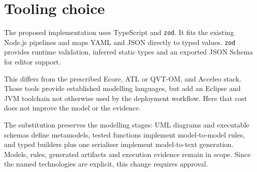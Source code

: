 \section{Tooling choice}
\label{sec:tooling}

The proposed implementation uses TypeScript and \texttt{zod}. It fits the
existing Node.js pipelines and maps YAML and JSON directly to typed values.
\texttt{zod} provides runtime validation, inferred static types and an exported
JSON Schema for editor support.

This differs from the prescribed Ecore, ATL or QVT-OM, and Acceleo stack. Those
tools provide established modelling languages, but add an Eclipse and JVM
toolchain not otherwise used by the deployment workflow. Here that cost does not
improve the model or the evidence.

The substitution preserves the modelling stages: UML diagrams and executable
schemas define metamodels, tested functions implement model-to-model rules, and
typed builders plus one serialiser implement model-to-text generation. Models,
rules, generated artifacts and execution evidence remain in scope. Since the
named technologies are explicit, this change requires approval.
